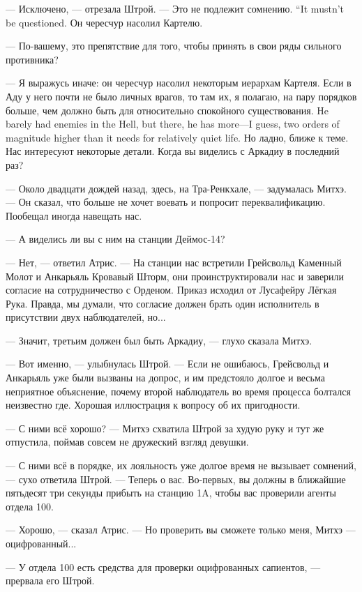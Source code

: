 --- Исключено, --- отрезала Штрой.
{--- Это не подлежит сомнению.}
{``It mustn't be questioned.}
Он чересчур насолил Картелю.

--- По-вашему, это препятствие для того, чтобы принять в свои ряды сильного противника?

--- Я выражусь иначе: он чересчур насолил некоторым иерархам Картеля.
{Если в Аду у него почти не было личных врагов, то там их, я полагаю, на пару порядков больше, чем должно быть для относительно спокойного существования.}
{He barely had enemies in the Hell, but there, he has more---I guess, two orders of magnitude higher than it needs for relatively quiet life.}
Но ладно, ближе к теме.
Нас интересуют некоторые детали.
Когда вы виделись с Аркадиу в последний раз?

--- Около двадцати дождей назад, здесь, на Тра-Ренкхале, --- задумалась Митхэ.
--- Он сказал, что больше не хочет воевать и попросит переквалификацию.
Пообещал иногда навещать нас.

--- А виделись ли вы с ним на станции Деймос-14?

--- Нет, --- ответил Атрис.
--- На станции нас встретили Грейсвольд Каменный Молот и Анкарьяль Кровавый Шторм, они проинструктировали нас и заверили согласие на сотрудничество с Орденом.
Приказ исходил от Лусафейру Лёгкая Рука.
Правда, мы думали, что согласие должен брать один исполнитель в присутствии двух наблюдателей, но...

--- Значит, третьим должен был быть Аркадиу, --- глухо сказала Митхэ.

--- Вот именно, --- улыбнулась Штрой.
--- Если не ошибаюсь, Грейсвольд и Анкарьяль уже были вызваны на допрос, и им предстояло долгое и весьма неприятное объяснение, почему второй наблюдатель во время процесса болтался неизвестно где.
Хорошая иллюстрация к вопросу об их пригодности.

--- С ними всё хорошо? --- Митхэ схватила Штрой за худую руку и тут же отпустила, поймав совсем не дружеский взгляд девушки.

--- С ними всё в порядке, их лояльность уже долгое время не вызывает сомнений, --- сухо ответила Штрой.
--- Теперь о вас.
Во-первых, вы должны в ближайшие пятьдесят три секунды прибыть на станцию 1A, чтобы вас проверили агенты отдела 100.

--- Хорошо, --- сказал Атрис.
--- Но проверить вы сможете только меня, Митхэ --- оцифрованный...

--- У отдела 100 есть средства для проверки оцифрованных сапиентов, --- прервала его Штрой.

